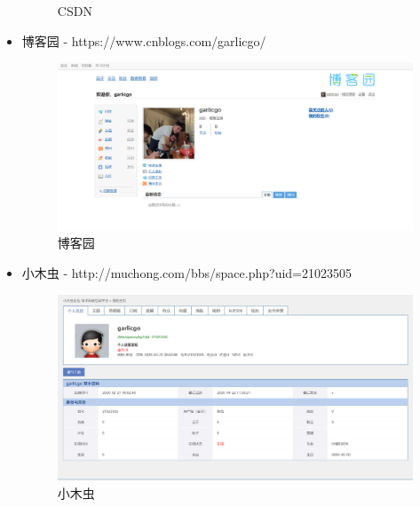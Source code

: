 \documentclass{article}
\begin{document}
\begin{itemize}
\begin{figure}[H]
		\caption{CSDN}
		\label{fig:csdn}
	\end{figure}
	\item 博客园 - https://www.cnblogs.com/garlicgo/
	\begin{figure}[H]
		\centering
		\includegraphics[width=0.7\linewidth]{bky}
		\caption{博客园}
		\label{fig:bky}
	\end{figure}
	\item 小木虫 - http://muchong.com/bbs/space.php?uid=21023505
	\begin{figure}[H]
		\centering
		\includegraphics[width=0.7\linewidth]{xmc}
		\caption{小木虫}
		\label{fig:xmc}
	\end{figure}
\end{itemize}


\hspace*{\fill} \\


\end{document}
